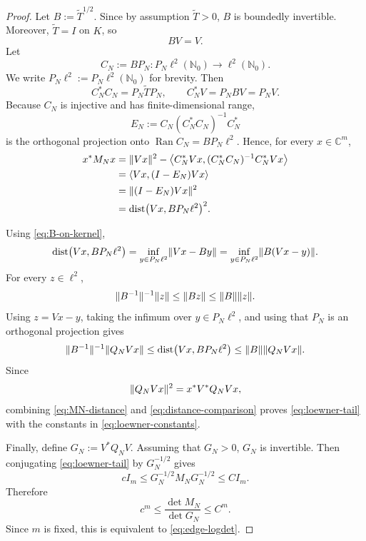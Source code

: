 \documentclass[11pt,a4paper,reqno]{amsart}
\theoremstyle{remark}
\newcommand{\Nzero}{\mathbb N_0}
\newcommand{\C}{\mathbb C}
\newcommand{\Ran}{\operatorname{Ran}}
\newcommand{\dist}{\operatorname{dist}}
\newcommand{\id}{I}
\DeclarePairedDelimiter{\norm}{\lVert}{\rVert}
\begin{document}
\begin{proof}
Let $B:=\widetilde T^{1/2}$.  Since by assumption $\widetilde T > 0$, $B$ is boundedly
invertible.  Moreover, $\widetilde T=\id$ on $K$, so
\begin{equation}\label{eq:B-on-kernel}
 BV=V.
\end{equation}
Let
\[
 C_N:=BP_N: P_N\ell^2(\Nzero)\rightarrow\ell^2(\Nzero).
\]
We write $P_N\ell^2 := P_N\ell^2(\Nzero)$ for brevity.
Then
\[
 C_N^*C_N=P_N\widetilde TP_N,
 \qquad
 C_N^*V=P_NBV=P_NV.
\]
Because $C_N$ is injective and has finite-dimensional range,
\begin{equation}\label{eq:EN-projection}
 E_N:=C_N(C_N^*C_N)^{-1}C_N^*
\end{equation}
is the orthogonal projection onto
$\Ran C_N=BP_N\ell^2$.  Hence, for every $x\in\C^m$,
\begin{align}
 x^*M_Nx
 &=\norm{Vx}^2-
   \bigl\langle C_N^*Vx,(C_N^*C_N)^{-1}C_N^*Vx\bigr\rangle\notag\\
 &=\langle Vx,(\id-E_N)Vx\rangle\notag\\
 &=\norm{(\id-E_N)Vx}^2\notag\\
 &=\dist\bigl(Vx,BP_N\ell^2\bigr)^2.
 \label{eq:MN-distance}
\end{align}

Using \eqref{eq:B-on-kernel},
\begin{equation*}
 \dist\bigl(Vx,BP_N\ell^2\bigr)
 =\inf_{y\in P_N\ell^2}\norm{Vx-By}
 =\inf_{y\in P_N\ell^2}\norm{B(Vx-y)}.
\end{equation*}
For every $z\in\ell^2$,
\[
 \norm{B^{-1}}^{-1}\norm{z}
 \le\norm{Bz}
 \le\norm{B}\norm{z}.
\]
Using $z = Vx - y$, taking the infimum over $y\in P_N\ell^2$, and
using that $P_N$ is an orthogonal projection gives
\begin{equation}\label{eq:distance-comparison}
 \norm{B^{-1}}^{-1}\norm{Q_NVx}
 \le\dist\bigl(Vx,BP_N\ell^2\bigr)
 \le\norm{B}\norm{Q_NVx}.
\end{equation}
Since
\[
 \norm{Q_NVx}^2=x^*V^*Q_NVx,
\]
combining \eqref{eq:MN-distance} and \eqref{eq:distance-comparison} proves
\eqref{eq:loewner-tail} with the constants in
\eqref{eq:loewner-constants}.

Finally, define $G_N:=V^*Q_NV$. Assuming that $G_N>0$, $G_N$ is invertible. Then conjugating
\eqref{eq:loewner-tail} by $G_N^{-1/2}$ gives
\[
 c\id_m\le G_N^{-1/2}M_NG_N^{-1/2}\le C\id_m.
\]
Therefore
\[
 c^m\le\frac{\det M_N}{\det G_N}\le C^m.
\]
Since $m$ is fixed, this is equivalent to \eqref{eq:edge-logdet}.
\end{proof}
\end{document}
